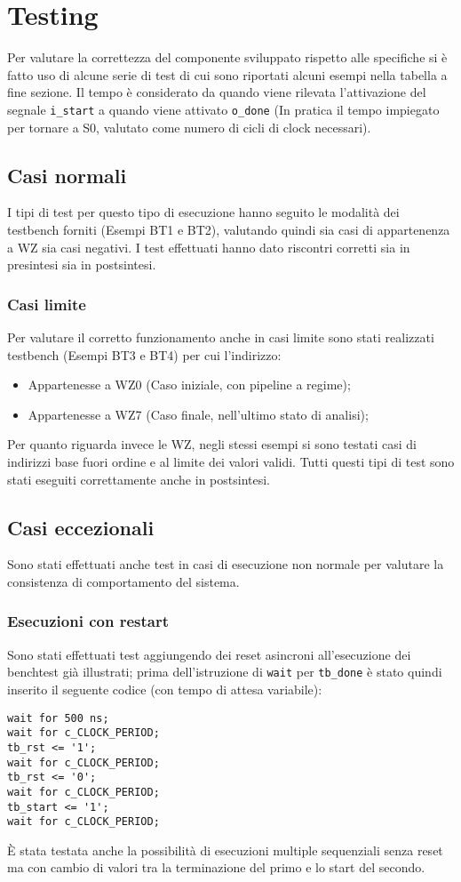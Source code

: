 
\section{Testing}
Per valutare la correttezza del componente sviluppato rispetto alle specifiche si \`e fatto uso di alcune serie di test di cui sono riportati alcuni esempi nella tabella a fine sezione. Il tempo \`e considerato da quando viene rilevata l'attivazione del segnale \texttt{i\_start} a quando viene attivato \texttt{o\_done} (In pratica il tempo impiegato per tornare a S0, valutato come numero di cicli di clock necessari).  

\subsection{Casi normali}
I tipi di test per questo tipo di esecuzione hanno seguito le modalit\`a dei testbench forniti (Esempi BT1 e BT2), valutando quindi sia casi di appartenenza a WZ sia casi negativi. I test effettuati hanno dato riscontri corretti sia in presintesi sia in postsintesi.

\subsubsection{Casi limite}
Per valutare il corretto funzionamento anche in casi limite sono stati realizzati testbench (Esempi BT3 e BT4) per cui l'indirizzo:
\begin{itemize}
	\item Appartenesse a WZ0 (Caso iniziale, con pipeline a regime);
	\item Appartenesse a WZ7 (Caso finale, nell'ultimo stato di analisi);
\end{itemize}
Per quanto riguarda invece le WZ, negli stessi esempi si sono testati casi di indirizzi base fuori ordine e al limite dei valori validi.
Tutti questi tipi di test sono stati eseguiti correttamente anche in postsintesi.

\subsection{Casi eccezionali}
Sono stati effettuati anche test in casi di esecuzione non normale per valutare la consistenza di comportamento del sistema.

\subsubsection{Esecuzioni con restart}
Sono stati effettuati test aggiungendo dei reset asincroni all'esecuzione dei benchtest gi\`a illustrati; prima dell'istruzione di \texttt{wait} per \texttt{tb\_done} \`e stato quindi inserito il seguente codice (con tempo di attesa variabile):
\begin{verbatim}
wait for 500 ns;
wait for c_CLOCK_PERIOD;
tb_rst <= '1';
wait for c_CLOCK_PERIOD;
tb_rst <= '0';
wait for c_CLOCK_PERIOD;
tb_start <= '1';
wait for c_CLOCK_PERIOD;
\end{verbatim}
\`E stata testata anche la possibilit\`a di esecuzioni multiple sequenziali senza reset ma con cambio di valori tra la terminazione del primo e lo start del secondo.

